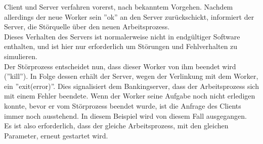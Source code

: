 Client und Server verfahren vorerst, nach bekanntem Vorgehen. Nachdem allerdings der neue Worker sein ''ok'' an den Server zurückschickt, informiert der Server, die Störquelle über den neuen Arbeitsprozess. \\
Dieses Verhalten des Servers ist normalerweise nicht in endgültiger Software enthalten, und ist hier nur erforderlich um Störungen und Fehlverhalten zu simulieren.\\
Der Störprozess entscheidet nun, dass dieser Worker von ihm beendet wird (''kill''). In Folge dessen erhält der Server, wegen der Verlinkung mit dem Worker, ein ''exit(error)''. Dies signalisiert dem Bankingserver, dass der Arbeitsprozess sich mit einem Fehler beendete. Wenn der Worker seine Aufgabe noch nicht erledigen konnte, bevor er vom Störprozess beendet wurde, ist die Anfrage des Clients immer noch ausstehend. In diesem Beispiel wird von diesem Fall ausgegangen.\\
Es ist also erforderlich, dass der gleiche Arbeitsprozess, mit den gleichen Parameter, erneut gestartet wird.

%
%
%